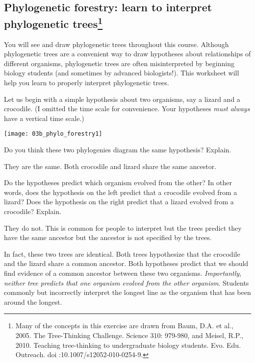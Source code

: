 \documentclass[12pt, hidelinks]{exam}
\newcommand*\AnswerBox[2]{%
    \parbox[t][#1]{0.92\textwidth}{%
    \begin{solution}#2\end{solution}}
}
\begin{document}
\subsection*{Phylogenetic forestry: learn to interpret phylogenetic trees\footnote{Many of the concepts in this exercise are drawn from Baum, D.A. et al., 2005. The Tree-Thinking Challenge. Science 310: 979-980, and Meisel, R.P., 2010. Teaching tree-thinking to undergraduate biology students. Evo. Edu. Outreach. doi :10.1007/s12052-010-0254-9.}}

You will see and draw phylogenetic trees throughout this course.
Although phylogenetic trees are a convenient way to draw hypotheses about
relationships of different organisms, phylogenetic trees are often
misinterpreted by beginning biology students (and sometimes by advanced
biologists!). This worksheet will help you learn to properly interpret
phylogenetic trees.

Let us begin with a simple hypothesis about two organisms, say a lizard
and a crocodile. (I omitted the time scale for convenience. Your
hypotheses \emph{must always} have a vertical time scale.)

\begin{center}%
	\noindent\texttt{[image: 03b\_phylo\_forestry1]}
\end{center}

\begin{questions}

\question
Do you think these two phylogenies diagram the same
hypothesis? Explain.

\AnswerBox{5\baselineskip}{They are the same. Both crocodile and lizard
share the same ancestor.}

\question
Do the hypotheses predict which organism evolved from the
other? In other words, does the hypothesis on the left predict that a
crocodile evolved from a lizard? Does the hypothesis on the right
predict that a lizard evolved from a crocodile? Explain.

\AnswerBox{5\baselineskip}{They do not. This is common for people to 
interpret but the trees predict they have the same ancestor but the ancestor
is not specified by the trees.}

\end{questions}

In fact, these two trees are identical. Both trees hypothesize that the
crocodile and the lizard share a common ancestor. Both hypotheses
predict that we should find evidence of a
common ancestor between these two organisms. \emph{Importantly, neither
tree predicts that one organism evolved from the other organism}.
Students commonly but incorrectly interpret the longest line as the organism that has
been around the longest.
\end{document}
